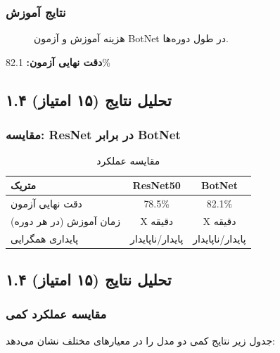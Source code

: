 \documentclass[12pt,a4paper]{article}
\theoremstyle{definition}
\begin{document}
\subsubsection*{نتایج آموزش}
\begin{figure}[H]
    \centering
    \caption{هزینه آموزش و آزمون BotNet در طول دوره‌ها.}
    \label{fig:botnet_loss}
\end{figure}

\textbf{دقت نهایی آزمون:} 82.1\%

\subsection{۱.۴ تحلیل نتایج (۱۵ امتیاز)}

\subsubsection*{مقایسه: ResNet در برابر BotNet}
\begin{table}[H]
    \centering
    \begin{tabular}{lcc}
        \toprule
        \textbf{متریک} & \textbf{ResNet50} & \textbf{BotNet} \\
        \midrule
        دقت نهایی آزمون & 78.5\% & 82.1\% \\
        زمان آموزش (در هر دوره) & X دقیقه & X دقیقه \\
        پایداری همگرایی & پایدار/ناپایدار & پایدار/ناپایدار \\
        \bottomrule
    \end{tabular}
    \caption{مقایسه عملکرد}
\end{table}

\subsection{۱.۴ تحلیل نتایج (۱۵ امتیاز)}

\subsubsection*{مقایسه عملکرد کمی}
جدول زیر نتایج کمی دو مدل را در معیارهای مختلف نشان می‌دهد:
\end{document}

